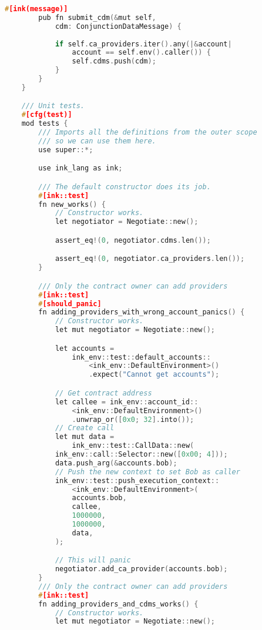 \begin{lstlisting}[label={source},language=c,caption={Smart Contract}]
        #[ink(message)]
        pub fn submit_cdm(&mut self, 
            cdm: ConjunctionDataMessage) {
            
            if self.ca_providers.iter().any(|&account| 
                account == self.env().caller()) {
                self.cdms.push(cdm);
            }
        }
    }

    /// Unit tests.
    #[cfg(test)]
    mod tests {
        /// Imports all the definitions from the outer scope 
        /// so we can use them here.
        use super::*;

        use ink_lang as ink;

        /// The default constructor does its job.
        #[ink::test]
        fn new_works() {
            // Constructor works.
            let negotiator = Negotiate::new();

            assert_eq!(0, negotiator.cdms.len());

            assert_eq!(0, negotiator.ca_providers.len());
        }

        /// Only the contract owner can add providers
        #[ink::test]
        #[should_panic]
        fn adding_providers_with_wrong_account_panics() {
            // Constructor works.
            let mut negotiator = Negotiate::new();

            let accounts =
                ink_env::test::default_accounts::
                    <ink_env::DefaultEnvironment>()
                    .expect("Cannot get accounts");

            // Get contract address
            let callee = ink_env::account_id::
                <ink_env::DefaultEnvironment>()
                .unwrap_or([0x0; 32].into());
            // Create call
            let mut data =
                ink_env::test::CallData::new(
            ink_env::call::Selector::new([0x00; 4])); 
            data.push_arg(&accounts.bob);
            // Push the new context to set Bob as caller
            ink_env::test::push_execution_context::
                <ink_env::DefaultEnvironment>(
                accounts.bob,
                callee,
                1000000,
                1000000,
                data,
            );

            // This will panic
            negotiator.add_ca_provider(accounts.bob);
        }
        /// Only the contract owner can add providers
        #[ink::test]
        fn adding_providers_and_cdms_works() {
            // Constructor works.
            let mut negotiator = Negotiate::new();


\end{lstlisting}
